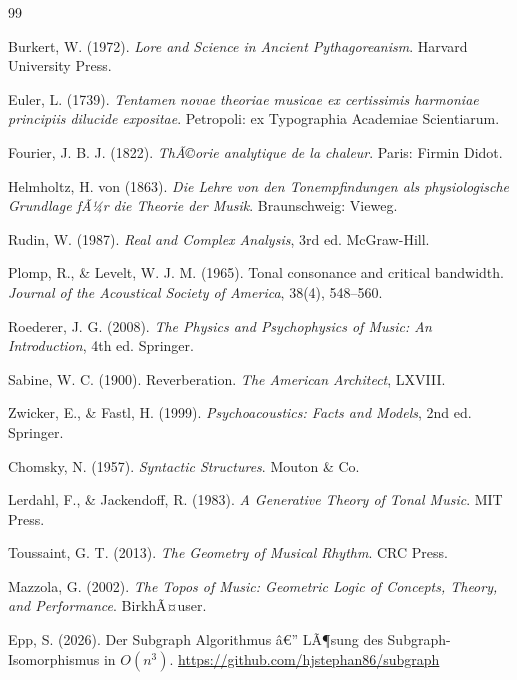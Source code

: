 ﻿\documentclass[a4paper,12pt]{article}
\theoremstyle{definition}
\begin{document}
\begin{thebibliography}{99}

Burkert, W. (1972).
\textit{Lore and Science in Ancient Pythagoreanism}.
Harvard University Press.

Euler, L. (1739).
\textit{Tentamen novae theoriae musicae ex certissimis harmoniae principiis dilucide expositae}.
Petropoli: ex Typographia Academiae Scientiarum.

Fourier, J. B. J. (1822).
\textit{ThÃ©orie analytique de la chaleur}.
Paris: Firmin Didot.

Helmholtz, H. von (1863).
\textit{Die Lehre von den Tonempfindungen als physiologische Grundlage fÃ¼r die
Theorie der Musik}.
Braunschweig: Vieweg.

Rudin, W. (1987).
\textit{Real and Complex Analysis}, 3rd ed.
McGraw-Hill.

Plomp, R., \& Levelt, W. J. M. (1965).
Tonal consonance and critical bandwidth.
\textit{Journal of the Acoustical Society of America}, 38(4), 548--560.

Roederer, J. G. (2008).
\textit{The Physics and Psychophysics of Music: An Introduction}, 4th ed.
Springer.

Sabine, W. C. (1900).
Reverberation.
\textit{The American Architect}, LXVIII.

Zwicker, E., \& Fastl, H. (1999).
\textit{Psychoacoustics: Facts and Models}, 2nd ed.
Springer.

Chomsky, N. (1957).
\textit{Syntactic Structures}.
Mouton \& Co.

Lerdahl, F., \& Jackendoff, R. (1983).
\textit{A Generative Theory of Tonal Music}.
MIT Press.

Toussaint, G. T. (2013).
\textit{The Geometry of Musical Rhythm}.
CRC Press.

Mazzola, G. (2002).
\textit{The Topos of Music: Geometric Logic of Concepts, Theory, and Performance}.
BirkhÃ¤user.

Epp, S. (2026).
Der Subgraph Algorithmus â€” LÃ¶sung des Subgraph-Isomorphismus in $O(n^3)$. \url{https://github.com/hjstephan86/subgraph}


\end{thebibliography}
\end{document}
